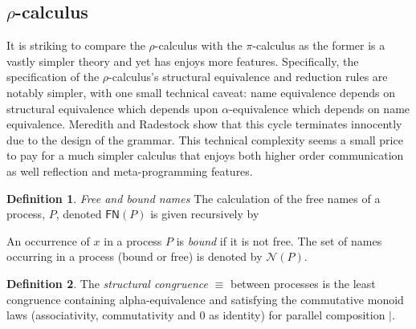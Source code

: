\documentclass[submission,copyright,creativecommons]{eptcs}
\newcommand{\pic}{$\pi$-calculus}
\newcommand{\pzero}{\mathbin{0}}
\newcommand{\names}[1]{\mathbin{\mathcal{N}(#1)}}
\newcommand{\freenames}[1]{\mathbin{\mathsf{FN}(#1)}}
\newcommand{\bc}{\mathbin{\mathbf{::=}}}
\newcommand{\bm}{\mathbin{\mathbf\mid}}
\newcommand{\rhoc}{$\rho$-calculus}
\theoremstyle{definition}
\newtheorem{definition}{Definition}
\theoremstyle{remark}
\theoremstyle{remark}
\begin{document}
\subsection{\rhoc}

It is striking to compare the {\rhoc} with the {\pic} as the former is
a vastly simpler theory and yet has enjoys more
features. Specifically, the specification of the {\rhoc}'s structural
equivalence and reduction rules are notably simpler, with one small
technical caveat: name equivalence depends on structural equivalence
which depends upon $\alpha$-equivalence which depends on name
equivalence. Meredith and Radestock show that this cycle terminates
innocently due to the design of the grammar. This technical complexity
seems a small price to pay for a much simpler calculus that enjoys
both higher order communication as well reflection and meta-programming
features.


\begin{definition}
\emph{Free and bound names} The calculation of the free names of a
process, $P$, denoted $\freenames{P}$ is given recursively by


An occurrence of $x$ in a process $P$ is \textit{bound} if it is not
free. The set of names occurring in a process (bound or free) is
denoted by $\names{P}$.
\end{definition}

\begin{definition}
  The {\em structural congruence} $\equiv$
  between processes \cite{SangiorgiWalker} is the least congruence containing
  alpha-equivalence and satisfying the commutative monoid laws
  (associativity, commutativity and $\pzero$ as identity) for parallel
  composition $|$.
\end{definition}
\end{document}
